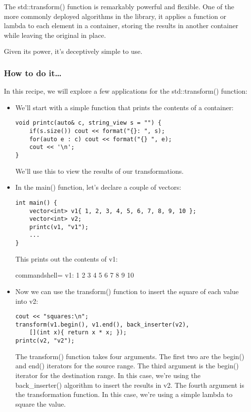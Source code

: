 
The std::transform() function is remarkably powerful and flexible. One of the more commonly deployed algorithms in the library, it applies a function or lambda to each element in a container, storing the results in another container while leaving the original in place.

Given its power, it's deceptively simple to use.

\subsubsection{How to do it…}

In this recipe, we will explore a few applications for the std::transform() function:

\begin{itemize}
\item 
We'll start with a simple function that prints the contents of a container:

\begin{lstlisting}[style=styleCXX]
void printc(auto& c, string_view s = "") {
	if(s.size()) cout << format("{}: ", s);
	for(auto e : c) cout << format("{} ", e);
	cout << '\n';
}
\end{lstlisting}

We'll use this to view the results of our transformations.

\item 
In the main() function, let's declare a couple of vectors:

\begin{lstlisting}[style=styleCXX]
int main() {
	vector<int> v1{ 1, 2, 3, 4, 5, 6, 7, 8, 9, 10 };
	vector<int> v2;
	printc(v1, "v1");
	...
}
\end{lstlisting}

This prints out the contents of v1:

\begin{tcblisting}{commandshell={}}
v1: 1 2 3 4 5 6 7 8 9 10
\end{tcblisting}

\item 
Now we can use the transform() function to insert the square of each value into v2:

\begin{lstlisting}[style=styleCXX]
cout << "squares:\n";
transform(v1.begin(), v1.end(), back_inserter(v2),
	[](int x){ return x * x; });
printc(v2, "v2");
\end{lstlisting}

The transform() function takes four arguments. The first two are the begin() and end() iterators for the source range. The third argument is the begin() iterator for the destination range. In this case, we're using the back\_inserter() algorithm to insert the results in v2. The fourth argument is the transformation function. In this case, we're using a simple lambda to square the value.


\end{itemize}
